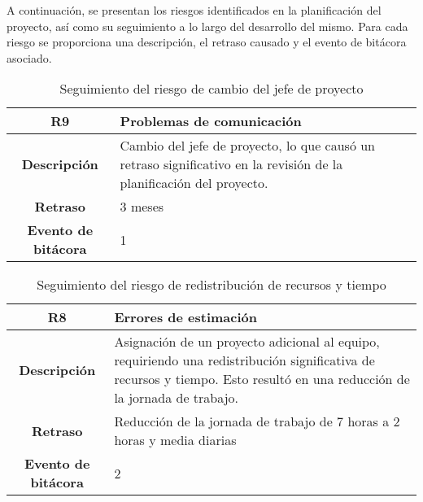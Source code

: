 A continuación, se presentan los riesgos identificados en la planificación del proyecto, así como su seguimiento a lo largo del desarrollo del mismo. Para cada riesgo se proporciona una descripción, el retraso causado y el evento de bitácora asociado.
\begin{table}[H]
	\centering
	\begin{tabular}{ | c | m{13cm} | }
		\hline
		{\textbf{R9}}               & {Problemas de comunicación}                                                                                         \\
		\hline
		\textbf{Descripción}        & Cambio del jefe de proyecto, lo que causó un retraso significativo en la revisión de la planificación del proyecto. \\
		\hline
		\textbf{Retraso}            & 3 meses                                                                                                             \\
		\hline
		\textbf{Evento de bitácora} & 1                                                                                                                   \\
		\hline
	\end{tabular}
	\caption{Seguimiento del riesgo de cambio del jefe de proyecto}
\end{table}

\vspace{0.5cm}

\begin{table}[H]
	\centering
	\begin{tabular}{ | c | m{13cm} | }
		\hline
		{\textbf{R8}}               & {Errores de estimación}                                                                                                                                                   \\
		\hline
		\textbf{Descripción}        & Asignación de un proyecto adicional al equipo, requiriendo una redistribución significativa de recursos y tiempo. Esto resultó en una reducción de la jornada de trabajo. \\
		\hline
		\textbf{Retraso}            & Reducción de la jornada de trabajo de 7 horas a 2 horas y media diarias                                                                                                   \\
		\hline
		\textbf{Evento de bitácora} & 2                                                                                                                                                                         \\
		\hline
	\end{tabular}
	\caption{Seguimiento del riesgo de redistribución de recursos y tiempo}
\end{table}

